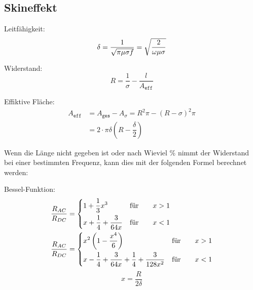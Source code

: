 \subsection{Skineffekt}

\begin{description}
    \item Leitfähigkeit:
          \[
              \delta = \frac{1}{\sqrt{\pi\mu\sigma f}} = \sqrt{\frac{2}{\omega\mu\sigma}} \\
          \]

    \item Widerstand:
          \[
              R = \frac{1}{\sigma} - \frac{l}{A_{\texttt{eff}}}
          \]

    \item Effiktive Fläche:
          \begin{align*}
              A_{\texttt{eff}} & = A_{\texttt{ges}} - A_{\sigma} = R^2\pi-(R-\sigma)^2\pi \\
                               & =2\cdot \pi \delta \left( R-\dfrac{\delta }{2}\right)
          \end{align*}
\end{description}

Wenn die Länge nicht gegeben ist oder nach Wieviel \% nimmt der Widerstand bei
einer bestimmten Frequenz, kann dies mit der folgenden Formel berechnet werden:

\begin{description}
    \item Bessel-Funktion:
          \begin{align*}
              \frac{R_{AC}}{R_{DC}} & =
              \begin{dcases}
                  1 + \frac{1}{3}x^3              & \text{für} \qquad x > 1 \\
                  x + \frac{1}{4} + \frac{3}{64x} & \text{für} \qquad x < 1 \\
              \end{dcases} \\
              \frac{R_{AC}}{R_{DC}} & =
              \begin{dcases}
                  x^2\left( 1-\frac{x^4}{6} \right)                               & \text{für} \qquad x > 1 \\
                  x- \frac{1}{4} + \frac{3}{64x} + \frac{1}{4} + \frac{3}{128x^2} & \text{für} \qquad x < 1 \\
              \end{dcases}
          \end{align*}
          \[
              \boxed{x=\frac{R}{2\delta}}
          \]
\end{description}
